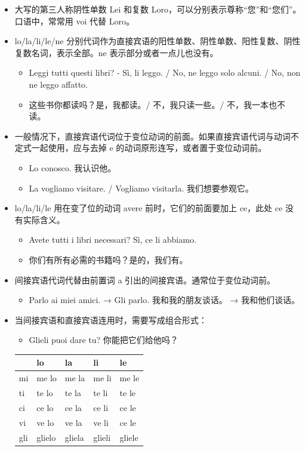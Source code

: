 \documentclass[UTF8,a4paper,titlepage,10pt]{report}
\begin{document}
\begin{enumerate}
\begin{itemize}
\item 大写的第三人称阴性单数 Lei 和复数 Loro，可以分别表示尊称“您”和“您们”。口语中，常常用 voi 代替 Loro。
\item lo/la/li/le/ne 分别代词作为直接宾语的阳性单数、阴性单数、阳性复数、阴性复数名词，表示全部。ne 表示部分或者一点儿也没有。
\begin{itemize}
\item Leggi tutti questi libri? - Sì, li leggo. / No, ne leggo solo alcuni. / No, non ne leggo affatto.
\item 这些书你都读吗？是，我都读。/ 不，我只读一些。/ 不，我一本也不读。
\end{itemize}
\item 一般情况下，直接宾语代词位于变位动词的前面。如果直接宾语代词与动词不定式一起使用，应与去掉 e 的动词原形连写，或者置于变位动词前。
\begin{itemize}
\item Lo conosco.  我认识他。
\item La vogliamo visitare. / Vogliamo visitarla.  我们想要参观它。
\end{itemize}
\item lo/la/li/le 用在变了位的动词 avere 前时，它们的前面要加上 ce，此处 ce 没有实际含义。
\begin{itemize}
\item Avete tutti i libri necessari? Sì, ce li abbiamo.
\item 你们有所有必需的书籍吗？是的，我们有。
\end{itemize}
\item 间接宾语代词代替由前置词 a 引出的间接宾语。通常位于变位动词前。
\begin{itemize}
\item Parlo ai miei amici. → Gli parlo.   我和我的朋友谈话。 → 我和他们谈话。
\end{itemize}
\item 当间接宾语和直接宾语连用时，需要写成组合形式：
\begin{itemize}
\item Glieli puoi dare tu? 你能把它们给他吗？
\end{itemize}
\begin{center}
\begin{tabular}{lllll}
 & lo & la & li & le\\
\hline
mi & me lo & me la & me li & me le\\
ti & te lo & te la & te li & te le\\
ci & ce lo & ce la & ce li & ce le\\
vi & ve lo & ve la & ve li & ce le\\
gli & glielo & gliela & glieli & gliele\\
\end{tabular}
\end{center}
\end{itemize}
\end{enumerate}
\end{document}
